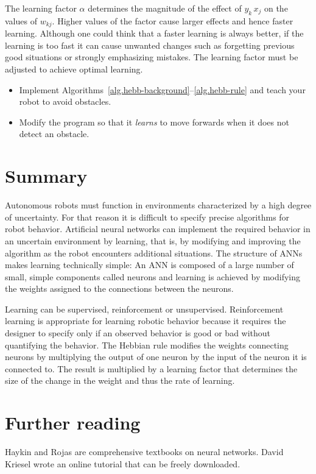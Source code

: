 The learning factor $\alpha$ determines the magnitude of the effect of $y_k\, x_j$ on the values of $w_{kj}$. Higher values of the factor cause larger effects and hence faster learning. Although one could think that a faster learning is always better, if the learning is too fast it can cause unwanted changes such as forgetting previous good situations or strongly emphasizing mistakes. The learning factor must be adjusted to achieve optimal learning.

\begin{framed}
\begin{itemize}
\item Implement Algorithms~\ref{alg.hebb-background}--\ref{alg.hebb-rule} and teach your robot to avoid obstacles.
\item Modify the program so that it \emph{learns} to move forwards when it does not detect an obstacle.
\end{itemize}
\end{framed}

\section{Summary}

Autonomous robots must function in environments characterized by a high degree of uncertainty. For that reason it is difficult to specify precise algorithms for robot behavior. Artificial neural networks can implement the required behavior in an uncertain environment by learning, that is, by modifying and improving the algorithm as the robot encounters additional situations. The structure of ANNs makes learning technically simple: An ANN is composed of a large number of small, simple components called neurons and learning is achieved by modifying the weights assigned to the connections between the neurons.

Learning can be supervised, reinforcement or unsupervised. Reinforcement learning is appropriate for learning robotic behavior because it requires the designer to specify only if an observed behavior is good or bad without quantifying the behavior. The Hebbian rule modifies the weights connecting neurons by multiplying the output of one neuron by the input of the neuron it is connected to. The result is multiplied by a learning factor that determines the size of the change in the weight and thus the rate of learning.

\section{Further reading}

Haykin \cite{haykin} and Rojas \cite{rojas} are comprehensive textbooks on neural networks. David Kriesel wrote an online tutorial \cite{kriesel} that can be freely downloaded.



